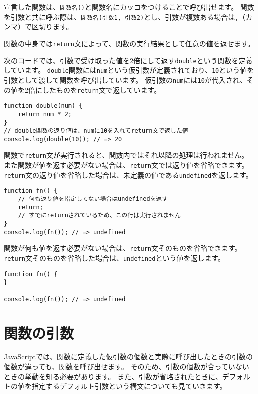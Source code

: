 宣言した関数は、\texttt{関数名()}と関数名にカッコをつけることで呼び出せます。
関数を引数と共に呼ぶ際は、\texttt{関数名(引数1, 引数2)}とし、引数が複数ある場合は\texttt{,}（カンマ）で区切ります。

関数の中身では\texttt{return}文によって、関数の実行結果として任意の値を返せます。

次のコードでは、引数で受け取った値を2倍にして返す\texttt{double}という関数を定義しています。
\texttt{double}関数には\texttt{num}という仮引数が定義されており、\texttt{10}という値を引数として渡して関数を呼び出しています。
仮引数の\texttt{num}には\texttt{10}が代入され、その値を2倍にしたものを\texttt{return}文で返しています。

\begin{lstlisting}
function double(num) {
    return num * 2;
}
// double関数の返り値は、numに10を入れてreturn文で返した値
console.log(double(10)); // => 20
\end{lstlisting}

関数で\texttt{return}文が実行されると、関数内ではそれ以降の処理は行われません。
また関数が値を返す必要がない場合は、\texttt{return}文では返り値を省略できます。
\texttt{return}文の返り値を省略した場合は、未定義の値である\texttt{undefined}を返します。

\begin{lstlisting}
function fn() {
    // 何も返り値を指定してない場合はundefinedを返す
    return;
    // すでにreturnされているため、この行は実行されません
}
console.log(fn()); // => undefined
\end{lstlisting}

関数が何も値を返す必要がない場合は、\texttt{return}文そのものを省略できます。
\texttt{return}文そのものを省略した場合は、\texttt{undefined}という値を返します。

\begin{lstlisting}
function fn() {
}

console.log(fn()); // => undefined
\end{lstlisting}

\hypertarget{function-arguments}{%
\section{関数の引数}\label{function-arguments}}

JavaScriptでは、関数に定義した仮引数の個数と実際に呼び出したときの引数の個数が違っても、関数を呼び出せます。
そのため、引数の個数が合っていないときの挙動を知る必要があります。
また、引数が省略されたときに、デフォルトの値を指定するデフォルト引数という構文についても見ていきます。

